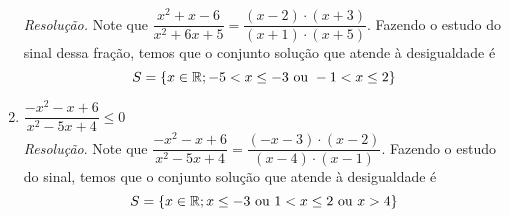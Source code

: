 \begin{enumerate}
    \emph{Resolução.} Note que $\dfrac{x^2 + x - 6}{x^2 + 6x + 5} = \dfrac{(x - 2) \cdot (x + 3)}{(x + 1) \cdot (x + 5)}$. Fazendo o estudo do sinal dessa fração, temos que o conjunto solução que atende à desigualdade é
    \begin{displaymath}
        S = \{ x \in \mathbb R; -5 < x \le -3 \text{ ou } -1 < x \le 2 \}
    \end{displaymath}
    \item $\dfrac{-x^2 - x + 6}{x^2 - 5x + 4} \le 0$
    \\
    \emph{Resolução}. Note que $\dfrac{-x^2 - x + 6}{x^2 - 5x + 4} = \dfrac{(-x -3) \cdot (x - 2)}{(x-4) \cdot (x-1)}$. Fazendo o estudo do sinal, temos que o conjunto solução que atende à desigualdade é
    \begin{displaymath}
        S = \{ x \in \mathbb R; x \le -3 \text{ ou } 1 < x \le 2 \text{ ou } x > 4 \}
    \end{displaymath}
\end{enumerate}